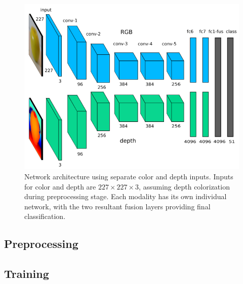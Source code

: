 \begin{figure}
\includegraphics[width=\linewidth]{img/architecture.png} 
\caption{Network architecture using separate color and depth inputs. Inputs for color and depth are $227 \times 227 \times 3$, assuming depth colorization during preprocessing stage. Each modality has its own individual network, with the two resultant fusion layers providing final classification.}
\label{fig:network}
\end{figure}


\subsection{Preprocessing}

\subsection{Training}





